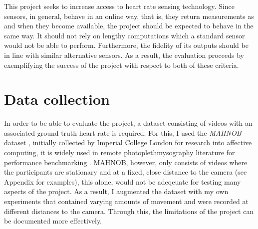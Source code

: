 This project seeks to increase access to heart rate sensing technology.
Since sensors, in general, behave in an online way, that is, they return measurements as and when they become available, the project should be expected to behave in the same way.
It should not rely on lengthy computations which a standard sensor would not be able to perform. 
Furthermore, the fidelity of its outputs should be in line with similar alternative sensors.
As a result, the evaluation proceeds by exemplifying the success of the project with respect to both of these criteria.

\section{Data collection}
In order to be able to evaluate the project, a dataset consisting of videos with an associated ground truth heart rate is required.
For this, I used the \textit{MAHNOB} dataset \cite{Mahnob}, initially collected by Imperial College London for research into affective computing, it is widely used in remote photoplethmysography literature for performance benchmarking \cite{novel}\cite{mahnob-example}\cite{mahnob-example-2}.
MAHNOB, however, only consists of videos where the participants are stationary and at a fixed, close distance to the camera (see Appendix for examples), this alone, would not be adeqeuate for testing many aspects of the project.
As a result, I augmented the dataset with my own experiments that contained varying amounts of movement and were recorded at different distances to the camera. 
Through this, the limitations of the project can be documented more effectively.

